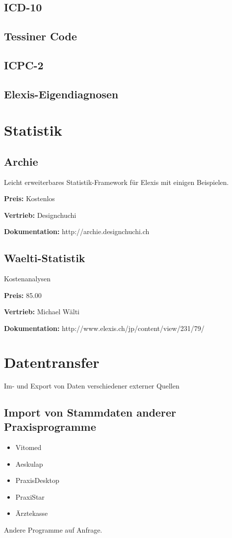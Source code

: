 \documentclass[paper=a4,BCOR8.25mm]{scrartcl}
\begin{document}
\subsection{ICD-10}
\subsection{Tessiner Code}
\subsection{ICPC-2}
\subsection{Elexis-Eigendiagnosen}

\section{Statistik}
\subsection{Archie}
Leicht erweiterbares Statistik-Framework für Elexis mit einigen Beispielen.

\textbf{Preis:} Kostenlos

\textbf{Vertrieb:} Designchuchi

\textbf{Dokumentation:} http://archie.designchuchi.ch

\subsection{Waelti-Statistik}
Kostenanalysen

\textbf{Preis:} 85.00

\textbf{Vertrieb:} Michael Wälti

\textbf{Dokumentation:} http://www.elexis.ch/jp/content/view/231/79/


\section{Datentransfer}
Im- und Export von Daten verschiedener externer Quellen

\subsection{Import von Stammdaten anderer Praxisprogramme}
\begin{itemize}
\item Vitomed
\item Aeskulap
\item PraxisDesktop
\item PraxiStar
\item Ärztekasse
\end{itemize}
 Andere Programme auf Anfrage.
\end{document}
